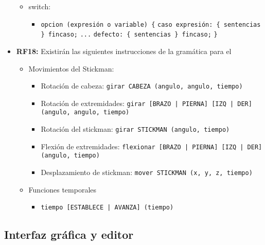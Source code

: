 \begin{itemize}
\begin{itemize}
        \item switch:
          
          \begin{itemize}
          \item \texttt{opcion (expresión o variable) \{}
            \texttt{caso expresión: \{ sentencias \} fincaso;}
            \texttt{...}
            \texttt{defecto: \{ sentencias \} fincaso;}
            \texttt{\}}
          \end{itemize}
          
        \end{itemize}
        
      \item \textbf{RF18:} Existirán las siguientes instrucciones de la gramática para el
        
        \begin{itemize}
        \item Movimientos del Stickman:
          
          \begin{itemize}
          \item Rotación de cabeza: \texttt{girar CABEZA (angulo, angulo, tiempo)}
          \item Rotación de extremidades: \texttt{girar [BRAZO | PIERNA] [IZQ | DER] (angulo, angulo, tiempo)}
          \item Rotación del stickman: \texttt{girar STICKMAN (angulo, tiempo)}
          \item Flexión de extremidades: \texttt{flexionar [BRAZO | PIERNA] [IZQ | DER] (angulo, tiempo)}
          \item Desplazamiento de stickman: \texttt{mover STICKMAN (x, y, z, tiempo)}
          \end{itemize}
          
        \item Funciones temporales
          
          \begin{itemize}
          \item \texttt{tiempo [ESTABLECE | AVANZA] (tiempo)}
          \end{itemize}
          
        \end{itemize}
        
      \end{itemize}
      
      \subsection{Interfaz gráfica y editor}

